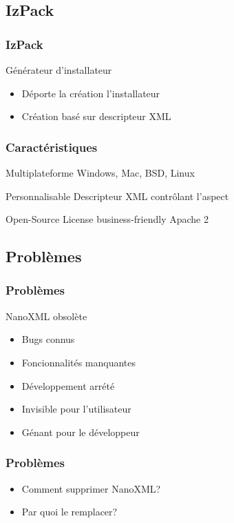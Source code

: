 \subsection{IzPack}
\begin{frame}\frametitle{IzPack}
\begin{block}{Générateur d'installateur}
	\begin{itemize}
		\item Déporte la création l'installateur
		\item Création basé sur descripteur XML
	\end{itemize}
\end{block}
\end{frame}
\begin{frame}\frametitle{Caractéristiques}
	\begin{block}{Multiplateforme}
	Windows, Mac, BSD, Linux
	\end{block}
	\begin{block}{Personnalisable}
	Descripteur XML contrôlant l'aspect
	\end{block}
	\begin{block}{Open-Source}
	License business-friendly Apache 2
	\end{block}

\end{frame}

\subsection{Problèmes}
\begin{frame}\frametitle{Problèmes}
	\begin{block}{NanoXML obsolète}
		\begin{itemize}
		\item Bugs connus
		\item Foncionnalités manquantes
		\item Développement arrété
		\end{itemize}
	\end{block}
	\begin{itemize}
		\item Invisible pour l'utilisateur
		\item Génant pour le développeur	
	\end{itemize}
\end{frame}
\begin{frame}\frametitle{Problèmes}
\begin{itemize}
	\item Comment supprimer NanoXML?
	\item Par quoi le remplacer?
\end{itemize}
\end{frame}
